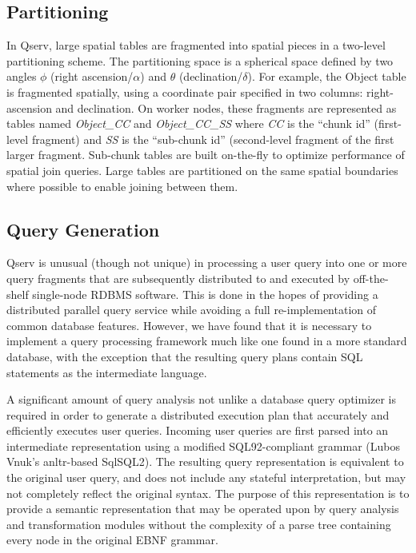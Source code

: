 \documentclass[DM,lsstdraft,toc]{lsstdoc}
\begin{document}
\subsection{Partitioning}\label{partitioning-1}

In Qserv, large spatial tables are fragmented into spatial pieces in a two-level
partitioning scheme. The partitioning space is a spherical space defined
by two angles $\phi$ (right ascension/$\alpha$) and $\theta$
(declination/$\delta$). For example, the Object table is fragmented spatially,
using a coordinate pair specified in two columns: right-ascension and
declination. On worker nodes, these fragments are represented as tables named
\emph{Object\_CC} and \emph{Object\_CC\_SS} where \emph{CC} is the ``chunk
id'' (first-level fragment) and \emph{SS} is the ``sub-chunk id'' (second-level
fragment of the first larger fragment. Sub-chunk tables are built on-the-fly
to optimize performance of spatial join queries. Large tables are
partitioned on the same spatial boundaries where possible to enable joining
between them.

\subsection{Query Generation}\label{query-generation}

Qserv is unusual (though not unique) in processing a user query into one or
more query fragments that are subsequently distributed to and executed by
off-the-shelf single-node RDBMS software. This is done in the hopes of
providing a distributed parallel query service while avoiding a full re-implementation
of common database features. However, we have found that it is
necessary to implement a query processing framework much like one found in a
more standard database, with the exception that the resulting query plans
contain SQL statements as the intermediate language.

A significant amount of query analysis not unlike a database query optimizer
is required in order to generate a distributed execution plan that accurately
and efficiently executes user queries. Incoming user queries are first parsed
into an intermediate representation using a modified SQL92-compliant grammar
(Lubos Vnuk's anltr-based SqlSQL2). The resulting query representation is
equivalent to the original user query, and does not include any stateful
interpretation, but may not completely reflect the original syntax. The
purpose of this representation is to provide a semantic representation that
may be operated upon by query analysis and transformation modules without the
complexity of a parse tree containing every node in the original EBNF grammar.
\end{document}
